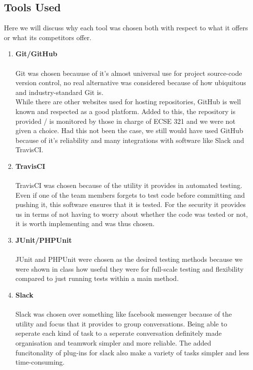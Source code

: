 \documentclass[12pt]{report}
\begin{document}
\subsection{Tools Used} Here we will discuss why each tool was chosen both with respect to what it offers or what its competitors offer.
\begin{enumerate}
    \item \textbf{Git/GitHub}\\\\
    	Git was chosen becauuse of it's almost universal use for project source-code version control, no real alternative was considered because of how ubiquitous and industry-standard Git is.\\

    	While there are other websites used for hosting repositories, GitHub is well known and respected as a good platform. Added to this, the repository is provided / is monitored by those in charge of ECSE 321 and we were not given a choice. Had this not been the case, we still would have used GitHub because of it's reliability and many integrations with software like Slack and TravisCI.

    \item \textbf{TravisCI}\\\\
    	TravisCI was chosen because of the utility it provides in automated testing. Even if one of the team members forgets to test code before committing and pushing it, this software ensures that it is tested. For the security it provides us in terms of not having to worry about whether the code was tested or not, it is worth implementing and was thus chosen.
    
    \item \textbf{JUnit/PHPUnit}\\\\
    	JUnit and PHPUnit were chosen as the desired testing methods because we were shown in class how useful they were for full-scale testing and flexibility compared to just running tests within a main method. 
    \item \textbf{Slack}\\\\
    	Slack was chosen over something like facebook messenger because of the utility and focus that it provides to group conversations. Being able to seperate each kind of task to a seperate conversation definitely made organisation and teamwork simpler and more reliable. The added funcitonality of plug-ins for slack also make a variety of tasks simpler and less time-consuming.
\end{enumerate}
\end{document}
